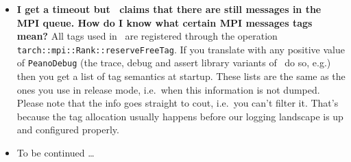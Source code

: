 \begin{itemize}
  arise due to AMR and typically are sorted out an iteration later anyway---and
  apply heuristics. If they detect that the global cell number seems to be too
  small, e.g., they assume that every rank meanwhile has refined once more and
  multiply the global cell count with $3^d$.
  \item \textbf{I get a timeout but \Peano\ claims that there are still
  messages in the MPI queue. How do I know what certain MPI messages tags
  mean?} All tags used in \Peano\ are registered through the operation \linebreak 
  \texttt{tarch::mpi::Rank::reserveFreeTag}. If you translate with any positive
  value of \texttt{PeanoDebug} (the trace, debug and assert library variants of
  \Peano\ do so, e.g.) then you get a list of tag semantics at startup. These
  lists are the same as the ones you use in release mode, i.e.~when this
  information is not dumped. Please note that the info goes straight to cout,
  i.e.~you can't filter it. That's because the tag allocation usually happens
  before our logging landscape is up and configured properly.
  \item To be continued \dots
\end{itemize}
